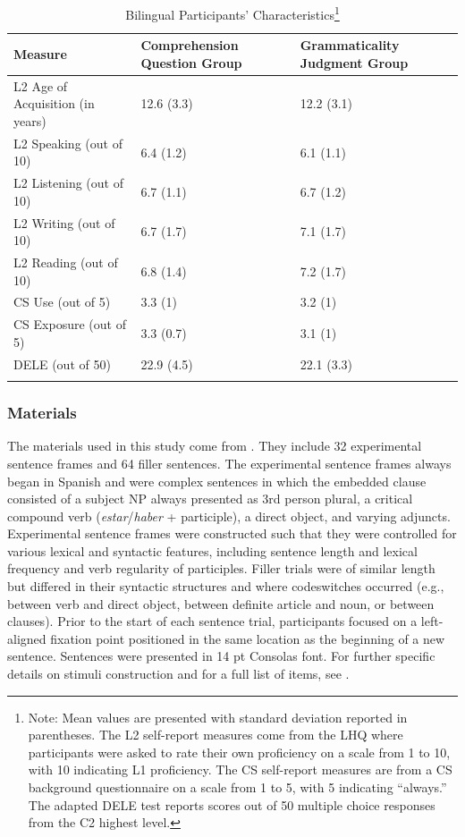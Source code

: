 \documentclass[output=paper,colorlinks,citecolor=brown]{langscibook}
\begin{document}
\begin{table}
\caption{Bilingual Participants' Characteristics\footnote{Note: Mean values are presented with standard deviation reported in parentheses. The L2 self-report measures come from the LHQ where participants were asked to rate their own proficiency on a scale from 1 to 10, with 10 indicating L1 proficiency. The CS self-report measures are from a CS background questionnaire on a scale from 1 to 5, with 5 indicating ``always.'' The adapted DELE test reports scores out of 50 multiple choice responses from the C2 highest level.}}
\label{tab:myname:demo}
 \begin{tabularx}{.8\textwidth}{XXX}
  \lsptoprule
    Measure        & Comprehension Question Group & Grammaticality Judgment Group\\
  \midrule
  L2 Age of Acquisition (in years)  &   12.6 (3.3)  &    12.2 (3.1)\\
  L2 Speaking (out of 10)  &   6.4 (1.2) &   6.1 (1.1)\\
  L2 Listening (out of 10) &    6.7 (1.1) &   6.7 (1.2)\\
  L2 Writing (out of 10)  &     6.7 (1.7) &     7.1 (1.7)\\
  L2 Reading (out of 10)  &     6.8 (1.4) &     7.2 (1.7)\\
  CS Use (out of 5)         &   3.3 (1)     &   3.2 (1)\\
  CS Exposure (out of 5)    &   3.3 (0.7)   &   3.1 (1)\\
  DELE (out of 50)          &   22.9 (4.5)  &   22.1 (3.3)\\

  \lspbottomrule
 \end{tabularx}
\end{table}

\subsubsection{Materials}
The materials used in this study come from \citet{GuzzardoTamargoetal2016}. They include 32 experimental sentence frames and 64 filler sentences. The experimental sentence frames always began in Spanish and were complex sentences in which the embedded clause consisted of a subject NP always presented as 3rd person plural, a critical compound verb (\textit{estar}/\textit{haber} + participle), a direct object, and varying adjuncts. Experimental sentence frames were constructed such that they were controlled for various lexical and syntactic features, including sentence length and lexical frequency and verb regularity of participles. Filler trials were of similar length but differed in their syntactic structures and where codeswitches occurred (e.g., between verb and direct object, between definite article and noun, or between clauses). Prior to the start of each sentence trial, participants focused on a left-aligned fixation point positioned in the same location as the beginning of a new sentence. Sentences were presented in 14 pt Consolas font. For further specific details on stimuli construction and for a full list of items, see \citet{GuzzardoTamargoetal2016}.
\end{document}
